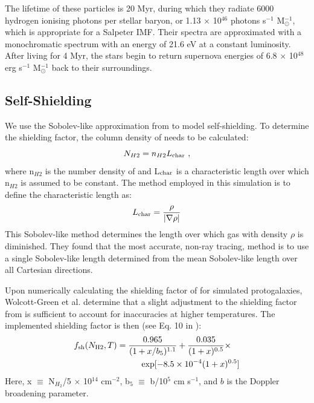 \documentclass[a4paper,fleqn,usenatbib]{mnras}
\begin{document}
The lifetime of these particles is 20 Myr, during which they radiate 6000 hydrogen ionising photons per stellar baryon, or 1.13 $\times$ 10$^{46}$ photons s$^{-1}$ M$_{\odot}^{-1}$, which is appropriate for a Salpeter IMF. Their spectra are approximated with a monochromatic spectrum with an energy of 21.6 eV at a constant luminosity. After living for 4 Myr, the stars begin to return supernova energies of 6.8 $\times$ 10$^{48}$ erg s$^{-1}$ M$_{\odot}^{-1}$ back to their surroundings.

\subsection{\hh{} Self-Shielding}
We use the Sobolev-like approximation from \citet{Wolcott11} to model \hh{} self-shielding. To determine the \hh{} shielding factor, the column density of \hh{} needs to be calculated:
\begin{equation} \label{Nh2}
	N_{H2} = n_{H2}L_{\rm char} \ ,
\end{equation}
where n$_{H2}$ is the number density of \hh{} and L$_{\rm char}$ is a characteristic length over which n$_{H2}$ is assumed to be constant. The method employed in this simulation is to define the characteristic length as:
\begin{equation} \label{Lchar}
	L_{\rm char} = \frac{\rho}{|\nabla \rho|}
\end{equation}
This Sobolev-like method determines the length over which gas with density $\rho$ is diminished. They found that the most accurate, non-ray tracing, method is to use a single Sobolev-like length determined from the mean Sobolev-like length over all Cartesian directions. 

Upon numerically calculating the shielding factor of \hh{} for simulated protogalaxies, Wolcott-Green et al. determine that a slight adjustment to the shielding factor from \citet{Draine96} is sufficient to account for inaccuracies at higher temperatures. The implemented shielding factor is then (see Eq. 10 in \citet{Wolcott11}):
\begin{equation} \label{shield}
	\begin{multlined}
	f_{\rm sh}(N_{\rm H2}, T) = \frac{0.965}{(1+x/b_{5})^{1.1}} + \frac{0.035}{(1+x)^{0.5}}  \times \\ \exp [-8.5 \times 10^{-4} (1+x)^{0.5}]
	\end{multlined}
\end{equation}
Here, x $\equiv$ N$_{H_{2}}$/5 $\times$ 10$^{14}$ cm$^{-2}$, b$_{5}$ $\equiv$ b/10$^{5}$ cm s$^{-1}$, and $b$ is the Doppler broadening parameter.
\end{document}
